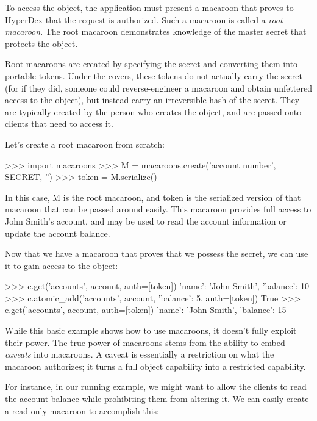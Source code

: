 To access the object, the application must present a macaroon that proves to
HyperDex that the request is authorized.  Such a macaroon is called a {\em root
macaroon}.  The root macaroon demonstrates knowledge of the master secret that
protects the object.

Root macaroons are created by specifying the secret and converting them into
portable tokens. Under the covers, these tokens do not actually carry the secret
(for if they did, someone could reverse-engineer a macaroon and obtain
unfettered access to the object), but instead carry an irreversible hash of the
secret. They are typically created by the person who creates the object, and are
passed onto clients that need to access it.

Let's create a root macaroon from scratch:

\begin{pythoncode}
>>> import macaroons
>>> M = macaroons.create('account number', SECRET, '')
>>> token = M.serialize()
\end{pythoncode}

In this case, M is the root macaroon, and token is the serialized version of
that macaroon that can be passed around easily. This macaroon provides full
access to John Smith's account, and may be used to read the account information
or update the account balance.

Now that we have a macaroon that proves that we possess the secret, we can use
it to gain access to the object:

\begin{pythoncode}
>>> c.get('accounts', account, auth=[token])
{'name': 'John Smith', 'balance': 10}
>>> c.atomic_add('accounts', account, {'balance': 5}, auth=[token])
True
>>> c.get('accounts', account, auth=[token])
{'name': 'John Smith', 'balance': 15}
\end{pythoncode}

While this basic example shows how to use macaroons, it doesn't fully exploit
their power. The true power of macaroons stems from the ability to embed {\em
caveats} into macaroons. A caveat is essentially a restriction on what the
macaroon authorizes; it turns a full object capability into a restricted
capability.

For instance, in our running example, we might want to allow the clients to read
the account balance while prohibiting them from altering it. We can easily
create a read-only macaroon to accomplish this:

